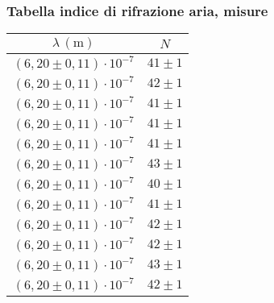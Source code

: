 \subsubsection{Tabella indice di rifrazione aria, misure}
    \begin{table}[H]
    \centering
        \begin{tabular}{|c|c|}
        \hline
        $ \lambda \, (\text{m}) $ & $ N $ \\
        \hline
        $ (6,20 \pm 0,11) \cdot 10^{-7} $ & $ 41 \pm 1 $ \\
        \hline
        $ (6,20 \pm 0,11) \cdot 10^{-7} $ & $ 42 \pm 1 $ \\
        \hline
        $ (6,20 \pm 0,11) \cdot 10^{-7} $ & $ 41 \pm 1 $ \\
        \hline
        $ (6,20 \pm 0,11) \cdot 10^{-7} $ & $ 41 \pm 1 $ \\
        \hline
        $ (6,20 \pm 0,11) \cdot 10^{-7} $ & $ 41 \pm 1 $ \\
        \hline
        $ (6,20 \pm 0,11) \cdot 10^{-7} $ & $ 43 \pm 1 $ \\
        \hline
        $ (6,20 \pm 0,11) \cdot 10^{-7} $ & $ 40 \pm 1 $ \\
        \hline
        $ (6,20 \pm 0,11) \cdot 10^{-7} $ & $ 41 \pm 1 $ \\
        \hline
        $ (6,20 \pm 0,11) \cdot 10^{-7} $ & $ 42 \pm 1 $ \\
        \hline
        $ (6,20 \pm 0,11) \cdot 10^{-7} $ & $ 42 \pm 1 $ \\
        \hline
        $ (6,20 \pm 0,11) \cdot 10^{-7} $ & $ 43 \pm 1 $ \\
        \hline
        $ (6,20 \pm 0,11) \cdot 10^{-7} $ & $ 42 \pm 1 $ \\
        \hline
        \end{tabular}
    \end{table}